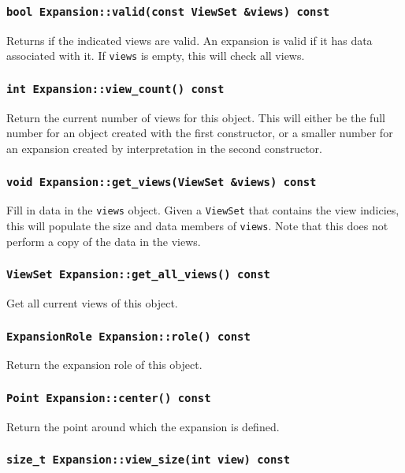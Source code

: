 \subsubsection{\texttt{bool Expansion::valid(const ViewSet \&views) const}}

Returns if the indicated views are valid. An expansion is valid if it has
data associated with it. If \texttt{views} is empty, this will check all
views.

\subsubsection{\texttt{int Expansion::view\_count() const}}

Return the current number of views for this object. This will either be the
full number for an object created with the first constructor, or a smaller
number for an expansion created by interpretation in the second constructor.

\subsubsection{\texttt{void Expansion::get\_views(ViewSet \&views) const}}

Fill in data in the \texttt{views} object. Given a \texttt{ViewSet} that
contains the view indicies, this will populate the size and data members of
\texttt{views}. Note that this does not perform a copy of the data in the
views.

\subsubsection{\texttt{ViewSet Expansion::get\_all\_views() const}}

Get all current views of this object.

\subsubsection{\texttt{ExpansionRole Expansion::role() const}}

Return the expansion role of this object.

\subsubsection{\texttt{Point Expansion::center() const}}

Return the point around which the expansion is defined.

\subsubsection{\texttt{size\_t Expansion::view\_size(int view) const}}

